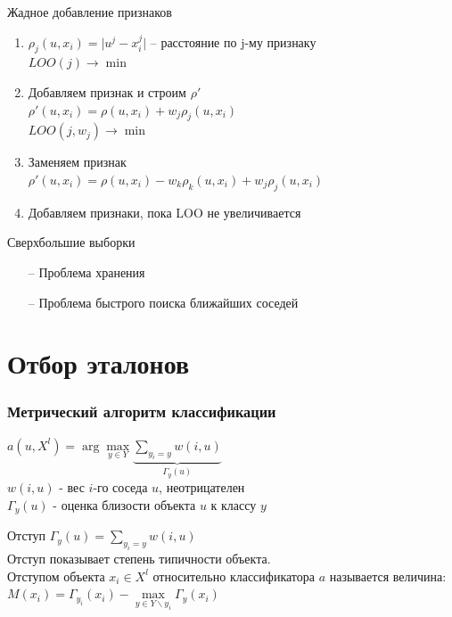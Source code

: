 \documentclass[10pt]{beamer}
\begin{document}
\begin{frame}{Жадное добавление признаков}
	\begin{enumerate} 
		\item ${\rho_j(u, x_i) = \vert u^j - x_i^j \vert}$ -- расстояние по j-му признаку\\
		          $LOO(j) \rightarrow \min$\\
		\item Добавляем признак и строим $\rho'$\\
							${\rho'(u, x_i) = \rho(u, x_i) + w_j\rho_j(u, x_i)}$\\
							$LOO(j, w_j) \rightarrow \min$\\
		\item Заменяем признак\\
            		${\rho'(u, x_i) = \rho(u, x_i) - w_k\rho_k(u, x_i) + w_j\rho_j(u, x_i)}$\\
		\item Добавляем признаки, пока LOO не увеличивается
	\end{enumerate}
\end{frame}

\begin{frame}{Сверхбольшие выборки}
	\begin{itemize} [<+- | alert@+>]
		\item[--] Проблема хранения
		\item[--] Проблема быстрого поиска ближайших соседей
	\end{itemize}
\end{frame}

\section{Отбор эталонов}

\begin{frame}\frametitle{Метрический алгоритм классификации}
	${a(u, X^l) = \arg\max\limits_{y \in Y} \underbrace{\sum\limits_{y_i = y} w(i, u)}_{\Gamma_y(u)} }$\\
	\vspace{5mm}
	$w(i, u)$ - вес $i$-го соседа $u$, неотрицателен\\
	$\Gamma_y(u)$ - оценка близости объекта $u$ к классу ${y}$
\end{frame}

\begin{frame}{Отступ}
	${\Gamma_y(u) = \sum\limits_{y_i = y} w(i, u)}$\\
	\bigbreak
	Отступ показывает степень \alert{типичности объекта}.\\
	\bigbreak
	Отступом объекта ${x_i \in X^l}$ относительно классификатора $a$ называется величина:\\
	\bigbreak
	\centering	
  ${M(x_i) = \Gamma_{y_i}(x_i) - \max\limits_{y \in Y\backslash y_i} \Gamma_y(x_i)}$

\end{frame}
\end{document}

